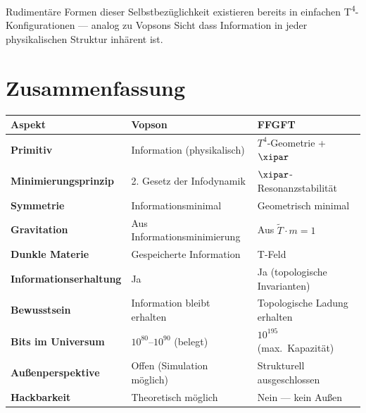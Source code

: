 Rudimentäre Formen dieser Selbstbezüglichkeit existieren bereits in einfachen
T\textsuperscript{4}-Konfigurationen --- analog zu Vopsons Sicht dass
Information in jeder physikalischen Struktur inhärent ist.

\section*{Zusammenfassung}

\begin{longtable}{>{\bfseries}p{5cm} p{4.5cm} p{4.5cm}}
\toprule
Aspekt & Vopson & FFGFT \\
\midrule
Primitiv & Information (physikalisch) & $T^4$-Geometrie + $\xipar$ \\
Minimierungsprinzip & 2. Gesetz der Infodynamik & $\xipar$-Resonanzstabilität \\
Symmetrie & Informationsminimal & Geometrisch minimal \\
Gravitation & Aus Informationsminimierung & Aus $\tilde{T} \cdot m = 1$ \\
Dunkle Materie & Gespeicherte Information & T-Feld \\
Informationserhaltung & Ja & Ja (topologische Invarianten) \\
Bewusstsein & Information bleibt erhalten & Topologische Ladung erhalten \\
Bits im Universum & $10^{80}$--$10^{90}$ (belegt) & $10^{195}$ (max.\ Kapazität) \\
Außenperspektive & Offen (Simulation möglich) & Strukturell ausgeschlossen \\
Hackbarkeit & Theoretisch möglich & Nein --- kein Außen \\
\bottomrule
\end{longtable}
